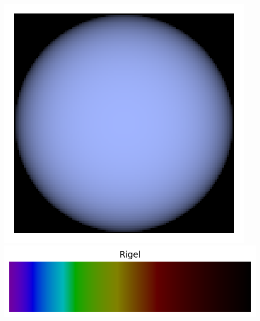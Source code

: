 \documentclass[12pt,a4paper]{article}
\begin{document}
\begin{center}
\includegraphics[height=\localheight]{images/star_rigel.png}
\includegraphics[height=\localheight]{images/spectrum_star_rigel.png}


\end{center}
\end{document}
